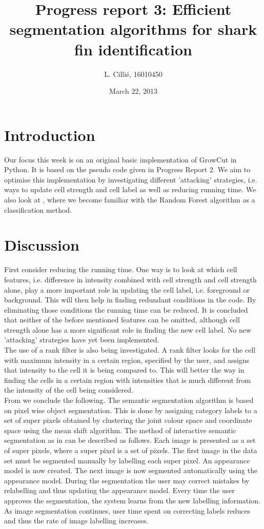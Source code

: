 \documentclass[a4paper,10pt]{article}
\title{Progress report 3: Efficient segmentation algorithms for shark fin identification}
\author{L. Cilli\'{e}, 16010450}
\date{March 22, 2013}
\begin{document}
\maketitle
\section{Introduction}
Our focus this week is on an original basic implementation of GrowCut in Python.  It is based on the pseudo code given in Progress Report 2.  We aim to optimise this implementation by investigating different 'attacking' strategies, i.e. ways to update cell strength and cell label as well as reducing running time. We also look at \cite{RF}, where we become familiar with the Random Forest algorithm as a classification method.  


\section{Discussion}
First consider reducing the running time.  One way is to look at which cell features, i.e. difference in intensity combined with cell strength and cell strength alone, play a more important role in updating the cell label, i.e. foreground or background.   This will then help in finding redundant conditions in the code.  By eliminating those conditions the running time can be reduced.  It is concluded that neither of the before mentioned features can be omitted, although cell strength alone has a more significant role in finding the new cell label.  No new 'attacking' strategies have yet been implemented. \\

\noindent The use of a rank filter is also being investigated.  A rank filter looks for the cell with maximum intensity in a certain region, specified by the user, and assigns that intensity to the cell it is being compared to.  This will better the way in finding the cells in a certain region with intensities that is much different from the intensity of the cell being considered. \\  

\noindent From \cite{RF} we conclude the following.  The semantic segmentation algorithm is based on pixel wise object segmentation.  This is done by assigning category labels to a set of super pixels obtained by clustering the joint colour space and coordinate space using the mean shift algorithm.
The method of interactive semantic segmentation as in \cite{RF} can be described as follows.  Each image is presented as a set of super pixels, where a super pixel is a set of pixels.  The first image in the data set must be segmented manually by labelling each super pixel.  An appearance model is now created.  The next image is now segmented automatically using the appearance model.  During the segmentation the user may correct mistakes by relabelling and thus updating the appearance model.  Every time the user approves the segmentation, the system learns from the new labelling information. As image segmentation continues, user time spent on correcting labels reduces and thus the rate of image labelling increases.  \\
\end{document}
